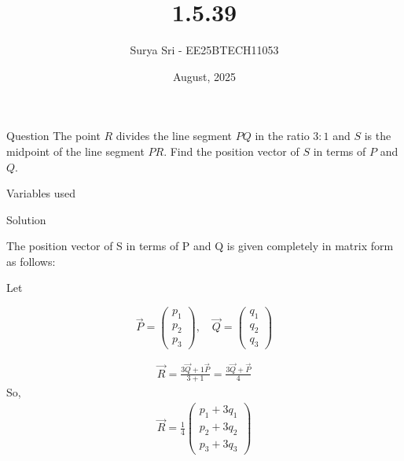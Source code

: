 \documentclass{beamer}
\title 
{1.5.39}
\date{August, 2025}
\author 
{Surya Sri - EE25BTECH11053}
\begin{document}
\frame{\titlepage}
\begin{frame}{Question}
The point ${R}$ divides the line segment $PQ$ in the ratio $3:1$ and $S$ is the midpoint of the line segment $PR$. Find the position vector of $S$ in terms of ${P}$ and ${Q}$.
\end{frame}



\begin{frame}{Variables used}
\begin{table}[H]    
  \centering
  
  \caption{Variables Used}
  \label{tab:1.5.39}
\end{table}

\end{frame}

\begin{frame}{Solution}


The position vector of S in terms of P and Q is given completely in matrix form as follows:

Let

$$
\vec{P} =
\begin{pmatrix}
p_1 \\
p_2 \\
p_3
\end{pmatrix}
,
\quad
\vec{Q} =
\begin{pmatrix}
q_1 \\
q_2 \\
q_3
\end{pmatrix}
$$


\begin{align}
\vec{R} = \frac{3\vec{Q} + 1\vec{P}}{3 + 1} = \frac{3\vec{Q} + \vec{P}}{4}
\end{align}
So,
\begin{align}
\vec{R} =
\frac{1}{4}
\begin{pmatrix}
p_1 + 3q_1 \\
p_2 + 3q_2 \\
p_3 + 3q_3
\end{pmatrix}
\end{align}

\end{frame}
\end{document}
